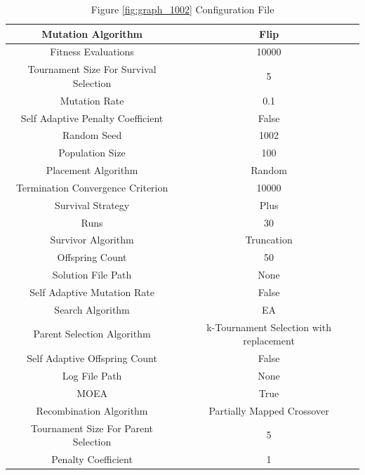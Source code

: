\documentclass{standalone}
\begin{document}
\begin{table}[!htb]
	\centering
	\caption{Figure \ref{fig:graph_1002} Configuration File}
	\label{tab:graph_1002}
	\begin{tabular}{| c | c |}
		\hline
		Mutation Algorithm		& Flip		 \\
		\hline
		Fitness Evaluations		& 10000		 \\
		\hline
		Tournament Size For Survival Selection		& 5		 \\
		\hline
		Mutation Rate		& 0.1		 \\
		\hline
		Self Adaptive Penalty Coefficient		& False		 \\
		\hline
		Random Seed		& 1002		 \\
		\hline
		Population Size		& 100		 \\
		\hline
		Placement Algorithm		& Random		 \\
		\hline
		Termination Convergence Criterion		& 10000		 \\
		\hline
		Survival Strategy		& Plus		 \\
		\hline
		Runs		& 30		 \\
		\hline
		Survivor Algorithm		& Truncation		 \\
		\hline
		Offspring Count		& 50		 \\
		\hline
		Solution File Path		& None		 \\
		\hline
		Self Adaptive Mutation Rate		& False		 \\
		\hline
		Search Algorithm		& EA		 \\
		\hline
		Parent Selection Algorithm		& k-Tournament Selection with replacement		 \\
		\hline
		Self Adaptive Offspring Count		& False		 \\
		\hline
		Log File Path		& None		 \\
		\hline
		MOEA		& True		 \\
		\hline
		Recombination Algorithm		& Partially Mapped Crossover		 \\
		\hline
		Tournament Size For Parent Selection		& 5		 \\
		\hline
		Penalty Coefficient		& 1		 \\
		\hline
	\end{tabular}
\end{table}
\end{document}
